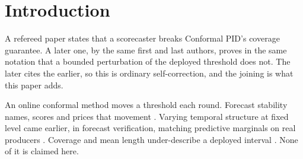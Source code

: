 \section{Introduction}
\label{sec:intro}

A refereed paper states that a scorecaster breaks Conformal PID's coverage guarantee. A later
one, by the same first and last authors, proves in the same notation that a bounded
perturbation of the deployed threshold does not. The later cites the earlier, so this is ordinary
self-correction, and the joining is what this paper adds.

An online conformal method \citep{angelopoulos2021gentle} moves a threshold each round. Forecast
stability names, scores and prices that movement
\citep{tunc2013nervousness,godahewa2025stability,vanbelle2023deepstability,%
pritularga2024congruence,genov2026switching,vanbelle2026stabilizing}. Varying temporal structure at
fixed level came earlier, in forecast verification, matching predictive marginals on real producers
\citep{gneiting2007calibration,pinson2012scenarios,worsnop2018scenarios}. Coverage and mean length
under-describe a deployed interval \citep{min2026questioning,vaze2026simultaneous}. None of it is
claimed here.

